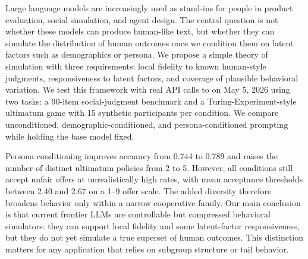 Large language models are increasingly used as stand-ins for people in product evaluation, social simulation, and agent design. The central question is not whether these models can produce human-like text, but whether they can simulate the distribution of human outcomes once we condition them on latent factors such as demographics or persona. We propose a simple theory of simulation with three requirements: local fidelity to known human-style judgments, responsiveness to latent factors, and coverage of plausible behavioral variation. We test this framework with real API calls to \gptfourone on May 5, 2026 using two tasks: a 90-item \socialiqa social-judgment benchmark and a Turing-Experiment-style ultimatum game with 15 synthetic participants per condition. We compare unconditioned, demographic-conditioned, and persona-conditioned prompting while holding the base model fixed.

Persona conditioning improves \socialiqa accuracy from 0.744 to 0.789 and raises the number of distinct ultimatum policies from 2 to 5. However, all conditions still accept unfair offers at unrealistically high rates, with mean acceptance thresholds between 2.40 and 2.67 on a 1--9 offer scale. The added diversity therefore broadens behavior only within a narrow cooperative family. Our main conclusion is that current frontier LLMs are controllable but compressed behavioral simulators: they can support local fidelity and some latent-factor responsiveness, but they do not yet simulate a true superset of human outcomes. This distinction matters for any application that relies on subgroup structure or tail behavior.
